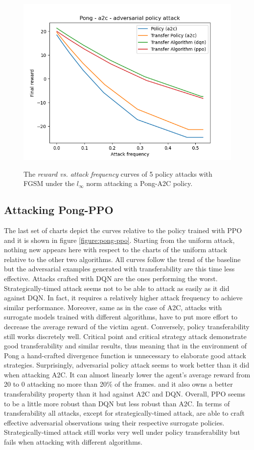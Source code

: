 \begin{figure}
    {\includegraphics[width=0.49\linewidth]{images/exp1/a2c-pong-adversarial_policy.png}}
  \caption{The {\it reward vs. attack frequency} curves of 5 policy attacks with FGSM under the \(l_\infty\) norm attacking a Pong-A2C policy.}
  \label{figure:pong-a2c}
\end{figure}

\subsection{Attacking Pong-PPO}
The last set of charts depict the curves relative to the policy trained with PPO and it is shown in figure \ref{figure:pong-ppo}. Starting from the uniform attack, nothing new appears here with respect to the charts of the uniform attack relative to the other two algorithms. All curves follow the trend of the baseline but the adversarial examples generated with transferability are this time less effective. Attacks crafted with DQN are the ones performing the worst. Strategically-timed attack seems not to be able to attack as easily as it did against DQN. In fact, it requires a relatively higher attack frequency to achieve similar performance. Moreover, same as in the case of A2C, attacks with surrogate models trained with different algorithms, have to put more effort to decrease the average reward of the victim agent. Conversely, policy transferability still works discretely well. Critical point and critical strategy attack demonstrate good transferability and similar results, thus meaning that in the environment of Pong a hand-crafted divergence function is unnecessary to elaborate good attack strategies. Surprisingly, adversarial policy attack seems to work better than it did when attacking A2C. It can almost linearly lower the agent's average reward from 20 to 0 attacking no more than 20\% of the frames. and it also owns a better transferability property than it had against A2C and DQN. Overall, PPO seems to be a little more robust than DQN but less robust than A2C. In terms of transferability all attacks, except for strategically-timed attack, are able to craft effective adversarial observations using their respective surrogate policies. Strategically-timed attack still works very well under policy transferability but fails when attacking with different algorithms.

